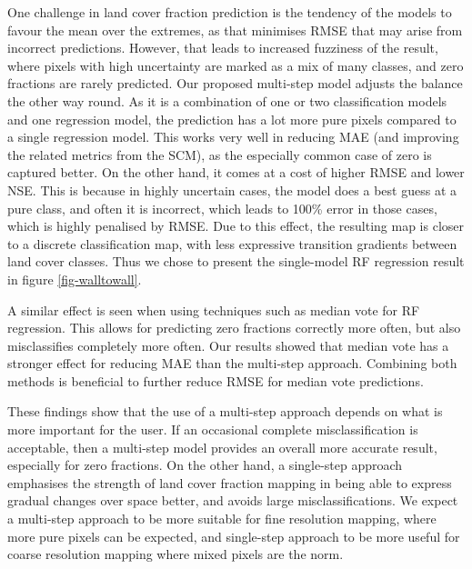 \documentclass[review,authoryear,3p]{elsarticle}
\begin{document}
One challenge in land cover fraction prediction is the tendency of the models to favour the mean over the extremes, as that minimises \gls{RMSE} that may arise from incorrect predictions.
However, that leads to increased fuzziness of the result, where pixels with high uncertainty are marked as a mix of many classes, and zero fractions are rarely predicted.
Our proposed multi-step model adjusts the balance the other way round.
As it is a combination of one or two classification models and one regression model, the prediction has a lot more pure pixels compared to a single regression model.
This works very well in reducing \gls{MAE} (and improving the related metrics from the \gls{SCM}), as the especially common case of zero is captured better.
On the other hand, it comes at a cost of higher \gls{RMSE} and lower \gls{NSE}.
This is because in highly uncertain cases, the model does a best guess at a pure class, and often it is incorrect, which leads to 100\% error in those cases, which is highly penalised by \gls{RMSE}.
Due to this effect, the resulting map is closer to a discrete classification map, with less expressive transition gradients between land cover classes.
Thus we chose to present the single-model \gls{RF} regression result in figure \ref{fig-walltowall}.

A similar effect is seen when using techniques such as median vote for \gls{RF} regression.
This allows for predicting zero fractions correctly more often, but also misclassifies completely more often.
Our results showed that median vote has a stronger effect for reducing \gls{MAE} than the multi-step approach.
Combining both methods is beneficial to further reduce \gls{RMSE} for median vote predictions.

These findings show that the use of a multi-step approach depends on what is more important for the user.
If an occasional complete misclassification is acceptable, then a multi-step model provides an overall more accurate result, especially for zero fractions.
On the other hand, a single-step approach emphasises the strength of land cover fraction mapping in being able to express gradual changes over space better, and avoids large misclassifications.
We expect a multi-step approach to be more suitable for fine resolution mapping, where more pure pixels can be expected, and single-step approach to be more useful for coarse resolution mapping where mixed pixels are the norm.
\end{document}
